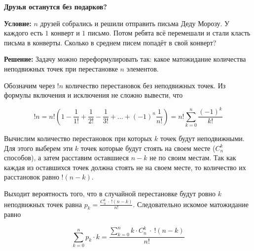 \documentclass{exam}
\begin{document}
    
\textbf{Друзья останутся без подарков?}

\textbf{Условие:} $n$ друзей собрались и решили отправить письма Деду Морозу. У каждого есть $1$ конверт и $1$ письмо. Потом ребята всё перемешали и стали класть письма в конверты. Сколько в среднем писем попадёт в свой конверт?

\textbf{Решение:} Задачу можно переформулировать так: какое матожидание количества неподвижных точек при перестановке $n$ элементов.

Обозначим через $!n$ количество перестановок без неподвижных точек. Из формулы включения и исключения не сложно вывести, что 

$$!n = n!\left(1 - \frac{1}{1!} + \frac{1}{2!} - \frac{1}{3!} + \dots + (-1)^n\frac{1}{n!}\right) = n!\sum_{k=0}^{n}\frac{(-1)^k}{k!}$$

Вычислим количество перестановок при которых $k$ точек будут неподвижными. Для этого выберем эти $k$ точек которые будут стоять на своем месте ($C_{n}^{k}$ способов), а затем расставим оставшиеся $n - k$ не по своим местам. Так как каждая из оставшихся точек должна стоять не на своем месте, то количество их расстановок равно $!(n - k)$.

Выходит вероятность того, что в случайной перестановке будут ровно $k$ неподвижных точек равна $p_k = \frac{C_{n}^{k}\ \cdot\ !(n - k)}{n!}$. Следовательно искомое матожидание равно

$$\sum_{k=0}^{n}p_k\cdot k = \frac{\sum_{k=0}^{n} k \cdot C_{n}^{k}\ \cdot\ ! (n - k)}{n!}$$
\end{document}
